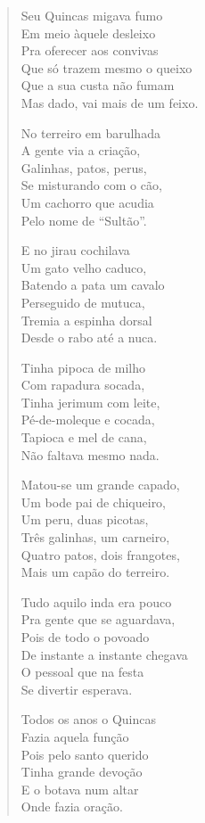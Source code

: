 \begin{verse}
Seu Quincas migava fumo\\
Em meio àquele desleixo\\
Pra oferecer aos convivas\\
Que só trazem mesmo o queixo\\
Que a sua custa não fumam\\
Mas dado, vai mais de um feixo.

No terreiro em barulhada\\
A gente via a criação,\\
Galinhas, patos, perus,\\
Se misturando com o cão,\\
Um cachorro que acudia\\
Pelo nome de “Sultão”.

E no jirau cochilava\\
Um gato velho caduco,\\
Batendo a pata um cavalo\\
Perseguido de mutuca,\\
Tremia a espinha dorsal\\
Desde o rabo até a nuca.

Tinha pipoca de milho\\
Com rapadura socada, \\
Tinha jerimum com leite,\\
Pé-de-moleque e cocada,\\
Tapioca e mel de cana,\\
Não faltava mesmo nada.
\pagebreak

Matou-se um grande capado,\\
Um bode pai de chiqueiro, \\
Um peru, duas picotas,\\
Três galinhas, um carneiro,\\
Quatro patos, dois frangotes,\\
Mais um capão do terreiro.

Tudo aquilo inda era pouco\\
Pra gente que se aguardava,\\
Pois de todo o povoado\\
De instante a instante chegava\\
O pessoal que na festa\\
Se divertir esperava.

Todos os anos o Quincas\\
Fazia aquela função\\
Pois pelo santo querido\\
Tinha grande devoção\\
E o botava num altar\\
Onde fazia oração.


\end{verse}
